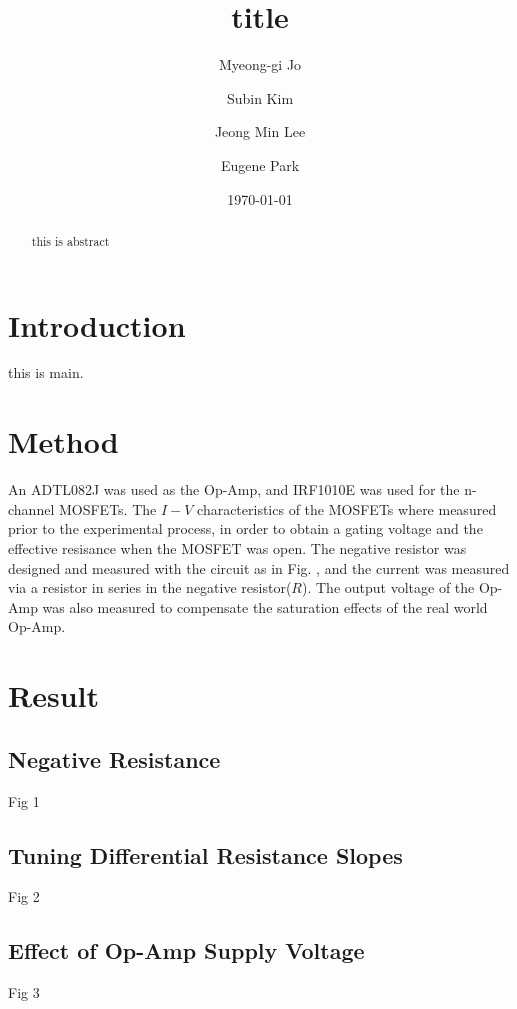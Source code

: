 \documentclass[%
 aip,
amsmath,amssymb,
reprint,
]{revtex4-1}
\begin{document}

\title[Intermediate Physics Laboratory 2, Module 2]{title}
\author{Myeong-gi Jo}
\author{Subin Kim}
\author{Jeong Min Lee}
\author{Eugene Park}

\date{\today}
\begin{abstract}
this is abstract
\end{abstract}

\maketitle

\section{\label{sec:Intro} Introduction} 
this is main. 

\section{\label{sec:Method} Method}
An ADTL082J was used as the Op-Amp, and IRF1010E was used for the n-channel MOSFETs. The $I-V$ characteristics of the MOSFETs where measured prior to the experimental process, in order to obtain a gating voltage and the effective resisance when the MOSFET was open. The negative resistor was designed and measured with the circuit as in Fig. , and the current was measured via a resistor in series in the negative resistor($R$). The output voltage of the Op-Amp was also measured to compensate the saturation effects of the real world Op-Amp.

\section{\label{sec:Result} Result}
\subsection{Negative Resistance}
Fig 1
\subsection{Tuning Differential Resistance Slopes}
Fig 2
\subsection{Effect of Op-Amp Supply Voltage}
Fig 3
\end{document}
